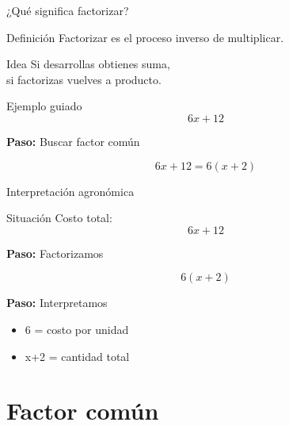 \documentclass[aspectratio=169,12pt]{beamer}
\newcommand{\Paso}[1]{
	\textbf{Paso:} #1
}
\begin{document}
	\begin{frame}{¿Qué significa factorizar?}
		
		\begin{block}{Definición}
			Factorizar es el proceso inverso de multiplicar.
		\end{block}
		
		\pause
		
		\begin{exampleblock}{Idea}
			Si desarrollas obtienes suma,\\
			si factorizas vuelves a producto.
		\end{exampleblock}
		
		\pause
		
		\begin{block}{Ejemplo guiado}
			\[
			6x + 12
			\]
			\pause
			
			\Paso{Buscar factor común}
			
			\pause
			\[
			6x + 12 = 6(x+2)
			\]
			
		\end{block}
		
	\end{frame}
	
	\begin{frame}{Interpretación agronómica}
		
		\begin{exampleblock}{Situación}
			Costo total:
			\[
			6x + 12
			\]
			\pause
			
			\Paso{Factorizamos}
			\[
			6(x+2)
			\]
			
			\pause
			
			\Paso{Interpretamos}
			\begin{itemize}
				\item 6 = costo por unidad
				\item x+2 = cantidad total
			\end{itemize}
			
		\end{exampleblock}
		
	\end{frame}
	
	\section{Factor común}
	
\end{document}
